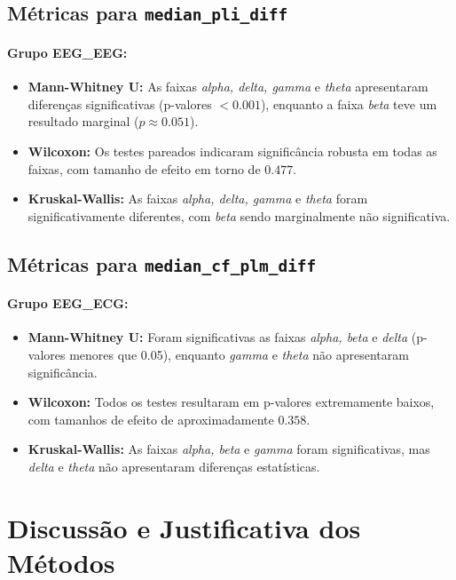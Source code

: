 \subsection{\texorpdfstring{Métricas para \texttt{median\_pli\_diff}}{Métricas para median\_pli\_diff}}

\paragraph{Grupo EEG\_EEG:}
\begin{itemize}
    \item \textbf{Mann-Whitney U:} As faixas \emph{alpha, delta, gamma} e \emph{theta} apresentaram diferenças significativas (p-valores $< 0.001$), enquanto a faixa \emph{beta} teve um resultado marginal ($p \approx 0.051$).
    \item \textbf{Wilcoxon:} Os testes pareados indicaram significância robusta em todas as faixas, com tamanho de efeito em torno de $0.477$.
    \item \textbf{Kruskal-Wallis:} As faixas \emph{alpha, delta, gamma} e \emph{theta} foram significativamente diferentes, com \emph{beta} sendo marginalmente não significativa.
\end{itemize}

\subsection{\texorpdfstring{Métricas para \texttt{median\_cf\_plm\_diff}}{Métricas para median\_cf\_plm\_diff}}

\paragraph{Grupo EEG\_ECG:}
\begin{itemize}
    \item \textbf{Mann-Whitney U:} Foram significativas as faixas \emph{alpha, beta} e \emph{delta} (p-valores menores que 0.05), enquanto \emph{gamma} e \emph{theta} não apresentaram significância.
    \item \textbf{Wilcoxon:} Todos os testes resultaram em p-valores extremamente baixos, com tamanhos de efeito de aproximadamente $0.358$.
    \item \textbf{Kruskal-Wallis:} As faixas \emph{alpha, beta} e \emph{gamma} foram significativas, mas \emph{delta} e \emph{theta} não apresentaram diferenças estatísticas.
\end{itemize}

\section{Discussão e Justificativa dos Métodos}

